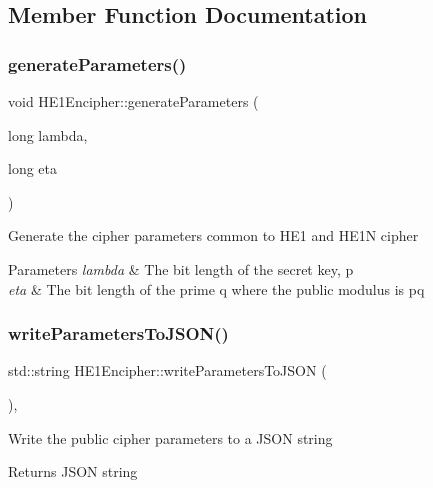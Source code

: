 \subsection{Member Function Documentation}
\mbox{\label{classHE1Encipher_a4ec1a767a1a3f4e71fa368dc99f6afd8}} 
\subsubsection{\texorpdfstring{generate\+Parameters()}{generateParameters()}}
{\footnotesize\ttfamily void H\+E1\+Encipher\+::generate\+Parameters (\begin{DoxyParamCaption}\item[{long}]{lambda,  }\item[{long}]{eta }\end{DoxyParamCaption})\hspace{0.3cm}{\ttfamily [protected]}}

Generate the cipher parameters common to H\+E1 and H\+E1N cipher 
\begin{DoxyParams}{Parameters}
{\em lambda} & The bit length of the secret key, p \\
\hline
{\em eta} & The bit length of the prime q where the public modulus is pq \\
\hline
\end{DoxyParams}
\mbox{\label{classHE1Encipher_a0aa1ef94d9147591367dbbc6ce03e5e1}} 
\subsubsection{\texorpdfstring{write\+Parameters\+To\+J\+S\+O\+N()}{writeParametersToJSON()}}
{\footnotesize\ttfamily std\+::string H\+E1\+Encipher\+::write\+Parameters\+To\+J\+S\+ON (\begin{DoxyParamCaption}{ }\end{DoxyParamCaption})\hspace{0.3cm}{\ttfamily [override]}, {\ttfamily [virtual]}}

Write the public cipher parameters to a J\+S\+ON string \begin{DoxyReturn}{Returns}
J\+S\+ON string 
\end{DoxyReturn}


